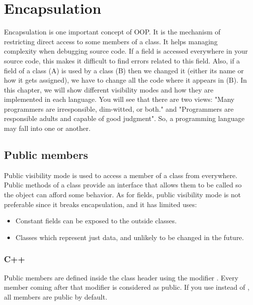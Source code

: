 \documentclass{KodeBook}
\begin{document}
\fi

\chapter{Encapsulation}

\begin{introduction}
	Encapsulation is one important concept of OOP. 
	It is the mechanism of restricting direct access to some members of a class.
	It helps managing complexity when debugging source code. 
	If a field is accessed everywhere in your source code, this makes it difficult to find errors related to this field. 
	Also, if a field of a class (A) is used by a class (B) then we changed it (either its name or how it gets assigned), we have to change all the code where it appears in (B).
	In this chapter, we will show different visibility modes and how they are implemented in each language.
	You will see that there are two views: "Many programmers are irresponsible, dim-witted, or both." and "Programmers are responsible adults and capable of good judgment".
	So, a programming language may fall into one or another.
\end{introduction}

\section{Public members}

Public visibility mode is used to access a member of a class from everywhere. 
Public methods of a class provide an interface that allows them to be called so the object can afford some behavior. 
As for fields, public visibility mode is not preferable since it breaks encapsulation, and it has limited uses:
\begin{itemize}
	\item Constant fields can be exposed to the outside classes.%
	\item Classes which represent just data, and unlikely to be changed in the future.
\end{itemize}

\subsection{C++}

Public members are defined inside the class header using the modifier . 
Every member coming after that modifier is considered as public.
If you use  instead of , all members are public by default.
\end{document}
